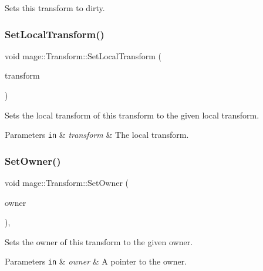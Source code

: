 Sets this transform to dirty. \hypertarget{classmage_1_1_transform_aeefc74d980e060b30d43f77bd8c1801f}{}\label{classmage_1_1_transform_aeefc74d980e060b30d43f77bd8c1801f} 
\subsubsection{\texorpdfstring{Set\+Local\+Transform()}{SetLocalTransform()}}
{\footnotesize\ttfamily void mage\+::\+Transform\+::\+Set\+Local\+Transform (\begin{DoxyParamCaption}\item[{\hyperlink{classmage_1_1_local_transform}{Local\+Transform}}]{transform }\end{DoxyParamCaption})\hspace{0.3cm}{\ttfamily [noexcept]}}

Sets the local transform of this transform to the given local transform.


\begin{DoxyParams}[1]{Parameters}
\mbox{\tt in}  & {\em transform} & The local transform. \\
\hline
\end{DoxyParams}
\hypertarget{classmage_1_1_transform_a6bc2db67891b193375d5b79cab4c223a}{}\label{classmage_1_1_transform_a6bc2db67891b193375d5b79cab4c223a} 
\subsubsection{\texorpdfstring{Set\+Owner()}{SetOwner()}}
{\footnotesize\ttfamily void mage\+::\+Transform\+::\+Set\+Owner (\begin{DoxyParamCaption}\item[{\hyperlink{classmage_1_1_proxy_ptr}{Proxy\+Ptr}$<$ \hyperlink{classmage_1_1_node}{Node} $>$}]{owner }\end{DoxyParamCaption})\hspace{0.3cm}{\ttfamily [private]}, {\ttfamily [noexcept]}}

Sets the owner of this transform to the given owner.


\begin{DoxyParams}[1]{Parameters}
\mbox{\tt in}  & {\em owner} & A pointer to the owner. \\
\hline
\end{DoxyParams}
\hypertarget{classmage_1_1_transform_ad4c49c5298d68f3945698ba88e461145}{}\label{classmage_1_1_transform_ad4c49c5298d68f3945698ba88e461145} 
